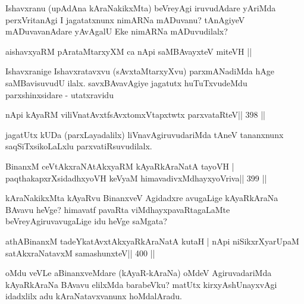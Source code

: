 \begin{artha}
Ishavxranu (upAdAna kAraNakikxMta) beVreyAgi iruvudAdare yAriMda perxVritanAgi I jagatatxnunx nimARNa mADuvanu? tAnAgiyeV mADuvavanAdare yAvAgalU Eke nimARNa mADuvudilalx?
\end{artha}


\begin{shl}
aishavxyaRM pArataMtarxyXM ca nApi saMBAvayxteV miteVH ||
\end{shl}

\begin{artha}
Ishavxranige Ishavxratavxvu (sAvxtaMtarxyXvu) parxmANadiMda hAge saMBavisuvudU ilalx. savxBAvavAgiye jagatutx huTuTxvudeMdu parxshinxsidare - utatxravidu
\end{artha}

\begin{shl}
nApi kAyaRM viliVnatAvxtfsAvxtomxVtapxtwtx parxvataRteV\hfill || 398 ||
\end{shl}

\begin{artha}
jagatUtx kUDa (parxLayadalilx) liVnavAgiruvudariMda tAneV tananxnunx saqSiTxsikoLaLxlu parxvatiRsuvudilalx.
\end{artha}


\begin{shl}
BinanxM ceVtAkxraNAtAkxyaRM kAyaRkAraNatA tayoVH |
paqthakapxrXsidadhxyoVH keVyaM himavadivxMdhayxyoVriva\hfill|| 399 ||
\end{shl}

\begin{artha}
kAraNakikxMta kAyaRvu BinanxveV Agidadxre avugaLige kAyaRkAraNa BAvavu heVge? himavatf pavaRta viMdhayxpavaRtagaLaMte beVreyAgiruvavugaLige idu heVge saMgata?
\end{artha}


\begin{shl}
athABinanxM tadeYkatAvxtAkxyaRkAraNatA kutaH |
nApi niSikxrXyarUpaM satAkxraNatavxM samashunxteV\hfill || 400 ||
\end{shl}

\begin{artha}
oMdu veVLe aBinanxveMdare (kAyaR-kAraNa) oMdeV AgiruvadariMda kAyaRkAraNa BAvavu elilxMda barabeVku? matUtx kirxyAshUnayxvAgi idadxlilx adu kAraNatavxvanunx hoMdalAradu.
\end{artha}

